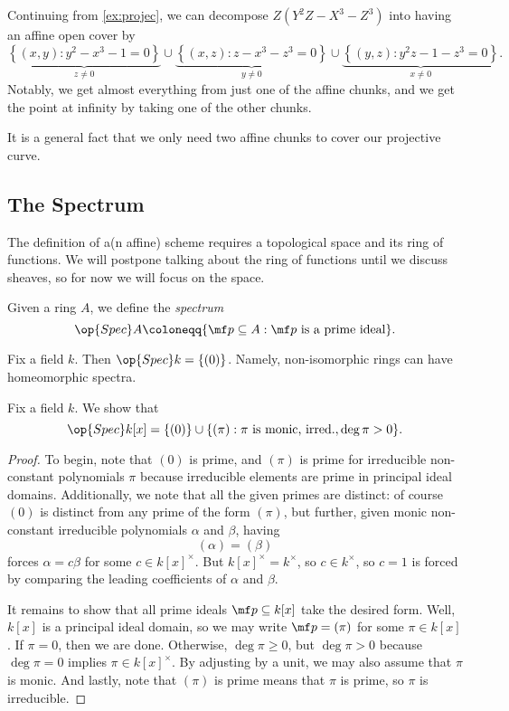 \documentclass[../notes.tex]{subfiles}
\begin{document}
\begin{example}
	Continuing from \autoref{ex:projec}, we can decompose $Z\left(Y^2Z-X^3-Z^3\right)$ into having an affine open cover by
	\[\underbrace{\left\{(x,y):y^2-x^3-1=0\right\}}_{z\ne0}\cup\underbrace{\left\{(x,z):z-x^3-z^3=0\right\}}_{y\ne0}\cup\underbrace{\left\{(y,z):y^2z-1-z^3=0\right\}}_{x\ne0}.\]
	Notably, we get almost everything from just one of the affine chunks, and we get the point at infinity by taking one of the other chunks.
\end{example}
\begin{remark}
	It is a general fact that we only need two affine chunks to cover our projective curve.
\end{remark}

\subsection{The Spectrum}
The definition of a(n affine) scheme requires a topological space and its ring of functions. We will postpone talking about the ring of functions until we discuss sheaves, so for now we will focus on the space.
\begin{definition}[Spectrum]
	Given a ring $A$, we define the \textit{spectrum}
	\[\op{Spec}A\coloneqq\{\mf p\subseteq A:\mf p\text{ is a prime ideal}\}.\]
\end{definition}
\begin{example}
	Fix a field $k$. Then $\op{Spec}k=\{(0)\}$. Namely, non-isomorphic rings can have homeomorphic spectra.
\end{example}
\begin{exe} \label{exe:speckx}
	Fix a field $k$. We show that
	\[\op{Spec}k[x]=\{(0)\}\cup\{(\pi):\pi\text{ is monic, irred.},\deg\pi>0\}.\]
\end{exe}
\begin{proof}
	To begin, note that $(0)$ is prime, and $(\pi)$ is prime for irreducible non-constant polynomials $\pi$ because irreducible elements are prime in principal ideal domains. Additionally, we note that all the given primes are distinct: of course $(0)$ is distinct from any prime of the form $(\pi)$, but further, given monic non-constant irreducible polynomials $\alpha$ and $\beta$, having
	\[(\alpha)=(\beta)\]
	forces $\alpha=c\beta$ for some $c\in k[x]^\times$. But $k[x]^\times=k^\times$, so $c\in k^\times$, so $c=1$ is forced by comparing the leading coefficients of $\alpha$ and $\beta$.

	It remains to show that all prime ideals $\mf p\subseteq k[x]$ take the desired form. Well, $k[x]$ is a principal ideal domain, so we may write $\mf p=(\pi)$ for some $\pi\in k[x]$. If $\pi=0$, then we are done. Otherwise, $\deg\pi\ge0$, but $\deg\pi>0$ because $\deg\pi=0$ implies $\pi\in k[x]^\times$. By adjusting by a unit, we may also assume that $\pi$ is monic. And lastly, note that $(\pi)$ is prime means that $\pi$ is prime, so $\pi$ is irreducible.
\end{proof}
\end{document}
